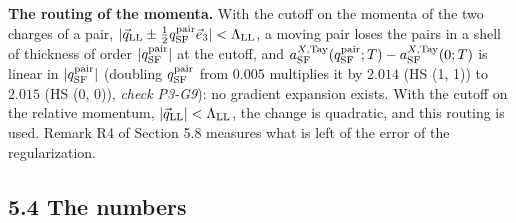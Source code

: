 \documentclass[
  10pt,
]{article}
\begin{document}
\textbf{The routing of the momenta.} With the cutoff on the momenta of
the two charges of a pair,
\(\lvert\vec q_{\rm LL}\pm\tfrac12q^{\rm pair}_{\rm SF}\vec e_3\rvert<\Lambda_{\rm LL}\),
a moving pair loses the pairs in a shell of thickness of order
\(\lvert q^{\rm pair}_{\rm SF}\rvert\) at the cutoff, and
\(a^{X,{\rm Tay}}_{\rm SF}(q^{\rm pair}_{\rm SF};T)-a^{X,{\rm Tay}}_{\rm SF}(0;T)\)
is linear in \(\lvert q^{\rm pair}_{\rm SF}\rvert\) (doubling
\(q^{\rm pair}_{\rm SF}\) from \(0.005\) multiplies it by \(2.014\) (HS
(1, 1)) to \(2.015\) (HS (0, 0)), \emph{check P3-G9}): no gradient
expansion exists. With the cutoff on the relative momentum,
\(\lvert\vec q_{\rm LL}\rvert<\Lambda_{\rm LL}\), the change is
quadratic, and this routing is used. Remark R4 of Section 5.8 measures
what is left of the error of the regularization.

\hypertarget{the-numbers-2}{%
\subsection{5.4 The numbers}\label{the-numbers-2}}
\end{document}
